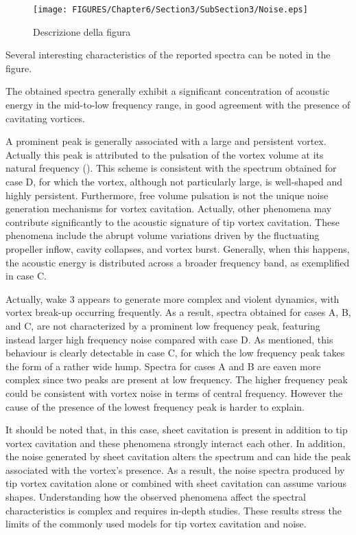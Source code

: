 \begin{figure}[h]
    \centering
    \texttt{[image: FIGURES/Chapter6/Section3/SubSection3/Noise.eps]}
    \caption{Descrizione della figura}
    \label{fig:NoiseSpectra}
\end{figure}

Several interesting characteristics of the reported spectra can be noted in the figure.

The obtained spectra generally exhibit a significant concentration of acoustic energy in the mid-to-low frequency range, in good agreement with the presence of cavitating vortices.

A prominent peak is generally associated with a large and persistent vortex. Actually this peak is attributed to the pulsation of the vortex volume at its natural frequency (\cite{ETV_JMSE}).
This scheme is consistent with the spectrum obtained for  case D, for which the vortex, although not particularly large, is well-shaped and highly persistent. 
Furthermore, free volume pulsation is not the  unique noise generation mechanisms for vortex cavitation. Actually, other phenomena may contribute significantly to the acoustic signature of tip vortex cavitation. These phenomena include the abrupt volume variations driven by the fluctuating propeller inflow, cavity collapses, and vortex burst.
Generally, when this happens, the acoustic energy is distributed across a broader frequency band, as exemplified in case C.

Actually, wake 3 appears to generate more complex and violent dynamics, with vortex break-up occurring frequently. As a result, spectra obtained for cases A, B, and C, are not characterized by a prominent low frequency peak, featuring instead larger high frequency noise compared with case D.
As mentioned, this behaviour is clearly detectable in case C, for which the low frequency peak takes the form of a rather wide hump.
Spectra for cases A and B are eaven more complex since two peaks are present at low frequency. The higher frequency peak could be consistent with vortex noise in terms of central frequency. However the cause of the presence of the lowest frequency peak is harder to explain.

It should be noted that, in this case, sheet cavitation is present in addition to tip vortex cavitation and these phenomena strongly interact each other. 
In addition, the noise generated by sheet cavitation alters the spectrum and can hide the peak associated with the vortex's presence.
As a result, the noise spectra produced by tip vortex cavitation alone or combined with sheet cavitation can assume various shapes. Understanding how the observed phenomena affect the spectral characteristics is complex and requires in-depth studies.
These results stress the limits of the commonly used models for tip vortex cavitation and noise.

